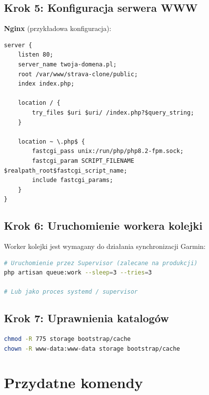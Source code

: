 \documentclass[12pt,a4paper]{report}
\begin{document}
\subsection{Krok 5: Konfiguracja serwera WWW}

\textbf{Nginx} (przykładowa konfiguracja):

\begin{lstlisting}[numbers=none]
server {
    listen 80;
    server_name twoja-domena.pl;
    root /var/www/strava-clone/public;
    index index.php;

    location / {
        try_files $uri $uri/ /index.php?$query_string;
    }

    location ~ \.php$ {
        fastcgi_pass unix:/run/php/php8.2-fpm.sock;
        fastcgi_param SCRIPT_FILENAME $realpath_root$fastcgi_script_name;
        include fastcgi_params;
    }
}
\end{lstlisting}

\subsection{Krok 6: Uruchomienie workera kolejki}

Worker kolejki jest wymagany do działania synchronizacji Garmin:

\begin{lstlisting}[language=bash, numbers=none]
# Uruchomienie przez Supervisor (zalecane na produkcji)
php artisan queue:work --sleep=3 --tries=3

# Lub jako proces systemd / supervisor
\end{lstlisting}

\subsection{Krok 7: Uprawnienia katalogów}

\begin{lstlisting}[language=bash, numbers=none]
chmod -R 775 storage bootstrap/cache
chown -R www-data:www-data storage bootstrap/cache
\end{lstlisting}

\section{Przydatne komendy}
\end{document}
